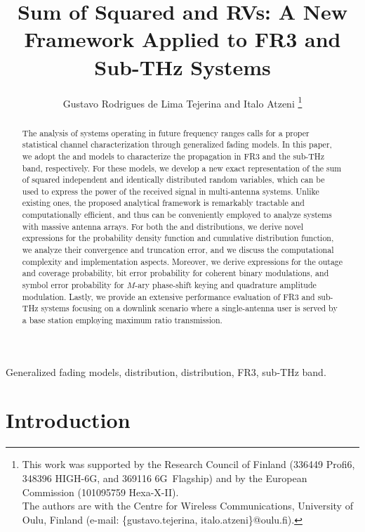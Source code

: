 \documentclass[journal,twocolumn]{IEEEtran}
\title{Sum of Squared \Ehm{} and \km{} RVs: A New Framework Applied to FR3 and Sub-THz Systems}
\author{Gustavo Rodrigues de Lima Tejerina and Italo Atzeni
\thanks{This work was supported by the Research Council of Finland (336449 Profi6, 348396 HIGH-6G, and 369116 6G~Flagship) and by the European Commission (101095759 Hexa-X-II). \\ \indent The authors are with the Centre for Wireless Communications, University of Oulu, Finland (e-mail: \{gustavo.tejerina, italo.atzeni\}@oulu.fi).}}
\begin{document}
\maketitle

\begin{abstract}
The analysis of systems operating in future frequency ranges calls for a proper statistical channel characterization through generalized fading models. In this paper, we adopt the \Ehm{} and \km{} models to characterize the propagation in FR3 and the sub-THz band, respectively. For these models, we develop a new exact representation of the sum of squared independent and identically distributed random variables, which can be used to express the power of the received signal in multi-antenna systems. Unlike existing ones, the proposed analytical framework is remarkably tractable and computationally efficient, and thus can be conveniently employed to analyze systems with massive antenna arrays. For both the \Ehm{} and \km{} distributions, we derive novel expressions for the probability density function and cumulative distribution function, we analyze their convergence and truncation error, and we discuss the computational complexity and implementation aspects. Moreover, we derive expressions for the outage and coverage probability, bit error probability for coherent binary modulations, and symbol error probability for $M$-ary phase-shift keying and quadrature amplitude modulation. Lastly, we provide an extensive performance evaluation of FR3 and sub-THz systems focusing on a downlink scenario where a single-antenna user is served by a base station employing maximum ratio transmission.
\end{abstract}

\begin{IEEEkeywords}
Generalized fading models, \Ehm{} distribution, \km{} distribution, FR3, sub-THz band.
\end{IEEEkeywords}


\section{Introduction} \label{sec:Intro}
\end{document}
